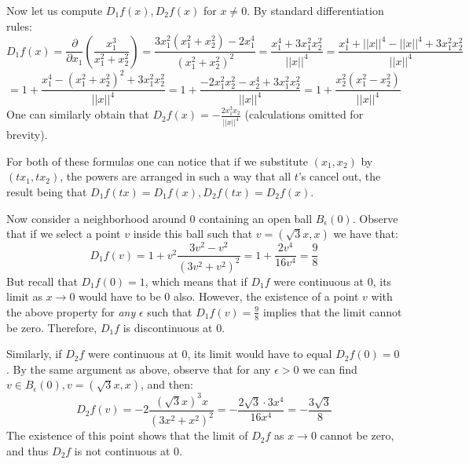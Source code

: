 \begin{solution}
    Now let us compute $D_1 f(x), D_2 f(x)$ for $x \neq 0$. By standard differentiation rules:
    $$D_1 f(x) = \frac{\partial}{\partial x_1}( \frac{x_1^3}{x_1^2 + x_2^2}) = \frac{3x_1^2(x_1^2 + x_2^2) - 2x_1^4}{(x_1^2 + x_2^2)^2} = \frac{x_1^4 + 3x_1^2 x_2^2}{\lvert \lvert x \rvert \rvert^4} = \frac{x_1^4 + \lvert \lvert x \rvert \rvert^4 - \lvert \lvert x \rvert \rvert^4 + 3x_1^2 x_2^2}{\lvert \lvert x \rvert \rvert^4}$$
    $$= 1 + \frac{x_1^4 - (x_1^2 + x_2^2)^2 + 3x_1^2 x_2^2}{\lvert \lvert x \rvert \rvert^4} = 1 + \frac{-2x_1^2 x_2^2 - x_2^4 + 3x_1^2 x_2^2}{\lvert \lvert x \rvert \rvert^4} = 1 + \frac{x_2^2(x_1^2 - x_2^2)}{\lvert \lvert x \rvert \rvert^4}$$
    One can similarly obtain that $D_2 f(x) = -\frac{2x_1^3x_2}{\lvert \lvert x \rvert \rvert^4}$ (calculations omitted for brevity).

    For both of these formulas one can notice that if we substitute $(x_1, x_2)$ by $(tx_1, tx_2)$, the powers are arranged in such a way that all $t$'s cancel out, the result being that $D_1 f(tx) = D_1 f(x), D_2 f(tx) = D_2 f(x)$.

    Now consider a neighborhood around 0 containing an open ball $B_\epsilon(0)$. Observe that if we select a point $v$ inside this ball such that $v = (\sqrt{3}x, x)$ we have that:
    $$D_1 f(v) = 1 + v^2 \frac{3v^2 - v^2}{(3v^2 + v^2)^2} = 1 + \frac{2v^4}{16v^4} = \frac{9}{8}$$
    But recall that $D_1 f(0) = 1$, which means that if $D_1 f$ were continuous at 0, its limit as $x \rightarrow 0$ would have to be 0 also. 
    However, the existence of a point $v$ with the above property for \textit{any} $\epsilon$ such that $D_1 f(v) = \frac{9}{8}$ implies that the limit cannot be zero. Therefore, $D_1 f$ is discontinuous at 0.

    Similarly, if $D_2 f$ were continuous at 0, its limit would have to equal $D_2 f(0) = 0$. 
    By the same argument as above, observe that for any $\epsilon > 0$ we can find $v \in B_\epsilon (0), v = (\sqrt{3}x, x)$, and then:
    $$D_2 f(v) = -2 \frac{(\sqrt{3}x)^3x}{(3x^2 + x^2)^2} = - \frac{2\sqrt{3}\cdot3x^4}{16x^4} = -\frac{3\sqrt{3}}{8}$$
    The existence of this point shows that the limit of $D_2 f$ as $x \rightarrow 0$ cannot be zero, and thus $D_2 f$ is not continuous at 0.
    
\end{solution}

